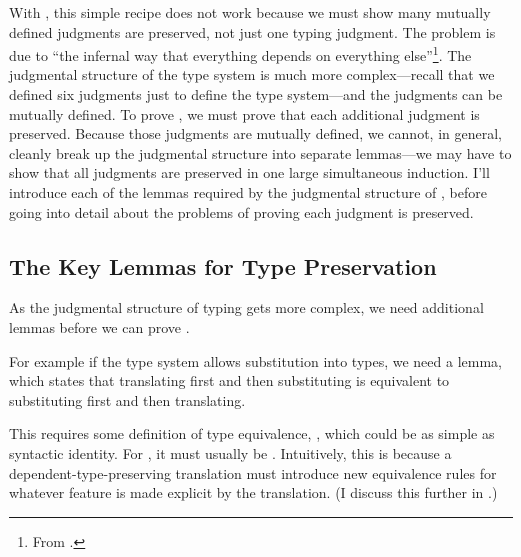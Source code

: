 With , this simple recipe does not work because we must
show many mutually defined judgments are preserved, not just one typing
judgment.
The problem is due to ``the infernal way that everything depends on everything
else''\footnote{From \citet{mcbride2010}.}.
The judgmental structure of the type system is much more complex---recall that
we defined six judgments just to define the \slang type system---and the
judgments can be mutually defined.
To prove , we must prove that each additional judgment
is preserved.
Because those judgments are mutually defined, we cannot, in general, cleanly
break up the judgmental structure into separate lemmas---we may have to show
that all judgments are preserved in one large simultaneous induction.
I'll introduce each of the lemmas required by the judgmental structure of
\slang, before going into detail about the problems of proving each judgment is
preserved.

\subsection{The Key Lemmas for Type Preservation}
As the judgmental structure of typing gets more complex, we need additional
lemmas before we can prove .

For example if the type system allows substitution into types, we need a
 lemma, which
states that translating first and then
substituting is equivalent to substituting first and then translating.
\begin{lemma}[Compositionality]
  \label{lem:type-pres:compositionality}
  \im{\sembrace{\subst{\sA}{\sApr}{\sx}} \equiv \subst{\sembrace{\sA}}{\sembrace{\sApr}}{\tx}}
\end{lemma}
\noindent This requires some definition of type equivalence, \im{\equiv}, which
could be as simple as syntactic identity.
For , it must usually be .
Intuitively, this is because a dependent-type-preserving translation must
introduce new equivalence rules for whatever feature is made explicit by the
translation.
(I discuss this further in .)

